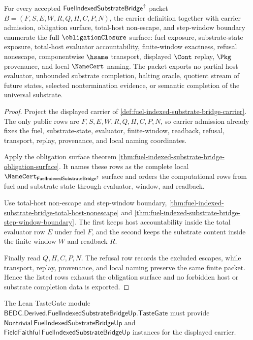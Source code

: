\begin{theorem}
\label{thm:fuel-indexed-substrate-bridge-obligation-closure}
For every accepted $\mathsf{FuelIndexedSubstrateBridge}^{\uparrow}$ packet $B=(F,S,E,W,R,Q,H,C,P,N)$, the carrier definition together with carrier admission, obligation surface, total-host non-escape, and step-window boundary enumerate the full $\obligationClosure$ surface: fuel exposure, substrate-state exposure, total-host evaluator accountability, finite-window exactness, refusal nonescape, componentwise $\hsame$ transport, displayed $\Cont$ replay, $\Pkg$ provenance, and local $\NameCert$ naming. The packet exports no partial host evaluator, unbounded substrate completion, halting oracle, quotient stream of future states, selected nontermination evidence, or semantic completion of the universal substrate.
\end{theorem}
\begin{proof}
Project the displayed carrier of \autoref{def:fuel-indexed-substrate-bridge-carrier}. The only public rows are $F,S,E,W,R,Q,H,C,P,N$, so carrier admission already fixes the fuel, substrate-state, evaluator, finite-window, readback, refusal, transport, replay, provenance, and local naming coordinates.

Apply the obligation surface theorem \autoref{thm:fuel-indexed-substrate-bridge-obligation-surface}. It names these rows as the complete local $\NameCert_{\FuelIndexedSubstrateBridgeUp}$ surface and orders the computational rows from fuel and substrate state through evaluator, window, and readback.

Use total-host non-escape and step-window boundary, \autoref{thm:fuel-indexed-substrate-bridge-total-host-nonescape} and \autoref{thm:fuel-indexed-substrate-bridge-step-window-boundary}. The first keeps host accountability inside the total evaluator row $E$ under fuel $F$, and the second keeps the substrate content inside the finite window $W$ and readback $R$.

Finally read $Q,H,C,P,N$. The refusal row records the excluded escapes, while transport, replay, provenance, and local naming preserve the same finite packet. Hence the listed rows exhaust the obligation surface and no forbidden host or substrate completion data is exported.
\end{proof}

The Lean TasteGate module $\mathsf{BEDC.Derived.FuelIndexedSubstrateBridgeUp.TasteGate}$ must provide $\mathsf{Nontrivial}\ \mathsf{FuelIndexedSubstrateBridgeUp}$ and $\mathsf{FieldFaithful}\ \mathsf{FuelIndexedSubstrateBridgeUp}$ instances for the displayed carrier.

